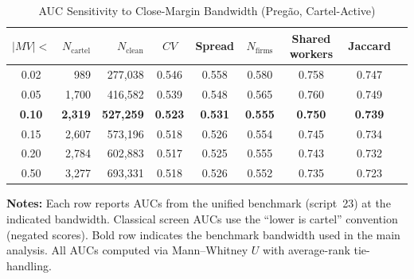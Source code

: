 \documentclass[12 pt]{elsarticle}
\begin{document}
\begin{subappendices}
\begin{table}[htbp]
\centering
\caption{AUC Sensitivity to Close-Margin Bandwidth (Pregão, Cartel-Active)}\label{tab:bw}
\begin{tabular}{crrcccccc}
\toprule
$\lvert MV \rvert <$ & $N_{\text{cartel}}$ & $N_{\text{clean}}$ & $CV$ & Spread & $N_{\text{firms}}$ & Shared workers & Jaccard \\
\midrule
0.02 & 989 & 277{,}038 & 0.546 & 0.558 & 0.580 & 0.758 & 0.747 \\
0.05 & 1{,}700 & 416{,}582 & 0.539 & 0.548 & 0.565 & 0.760 & 0.749 \\
\textbf{0.10} & \textbf{2{,}319} & \textbf{527{,}259} & \textbf{0.523} & \textbf{0.531} & \textbf{0.555} & \textbf{0.750} & \textbf{0.739} \\
0.15 & 2{,}607 & 573{,}196 & 0.518 & 0.526 & 0.554 & 0.745 & 0.734 \\
0.20 & 2{,}784 & 602{,}883 & 0.517 & 0.525 & 0.555 & 0.743 & 0.732 \\
0.50 & 3{,}277 & 693{,}331 & 0.518 & 0.526 & 0.552 & 0.735 & 0.723 \\
\bottomrule
\end{tabular}
\vspace{0.5em}
\begin{minipage}{0.95\textwidth}
\scriptsize{\textbf{Notes:} Each row reports AUCs from the unified benchmark (script~23) at the indicated bandwidth. Classical screen AUCs use the ``lower is cartel'' convention (negated scores). Bold row indicates the benchmark bandwidth used in the main analysis. All AUCs computed via Mann--Whitney $U$ with average-rank tie-handling.\par}
\end{minipage}
\end{table}

\end{subappendices}
\end{document}
